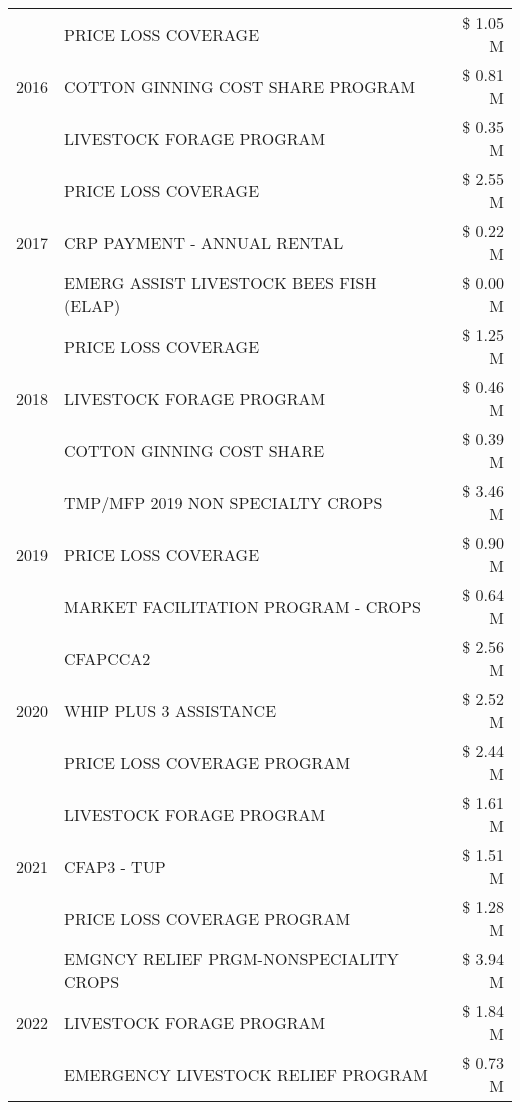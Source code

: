 \begin{tabular}{llr}
\cline{1-3}
\multirow[t]{3}{*}{2016} & PRICE LOSS COVERAGE & \$ 1.05 M \\
 & COTTON GINNING COST SHARE PROGRAM & \$ 0.81 M \\
 & LIVESTOCK FORAGE PROGRAM & \$ 0.35 M \\
\cline{1-3}
\multirow[t]{3}{*}{2017} & PRICE LOSS COVERAGE & \$ 2.55 M \\
 & CRP PAYMENT - ANNUAL RENTAL & \$ 0.22 M \\
 & EMERG ASSIST LIVESTOCK BEES FISH (ELAP) & \$ 0.00 M \\
\cline{1-3}
\multirow[t]{3}{*}{2018} & PRICE LOSS COVERAGE & \$ 1.25 M \\
 & LIVESTOCK FORAGE PROGRAM & \$ 0.46 M \\
 & COTTON GINNING COST SHARE & \$ 0.39 M \\
\cline{1-3}
\multirow[t]{3}{*}{2019} & TMP/MFP 2019 NON SPECIALTY CROPS & \$ 3.46 M \\
 & PRICE LOSS COVERAGE & \$ 0.90 M \\
 & MARKET FACILITATION PROGRAM - CROPS & \$ 0.64 M \\
\cline{1-3}
\multirow[t]{3}{*}{2020} & CFAPCCA2 & \$ 2.56 M \\
 & WHIP PLUS 3 ASSISTANCE & \$ 2.52 M \\
 & PRICE LOSS COVERAGE PROGRAM & \$ 2.44 M \\
\cline{1-3}
\multirow[t]{3}{*}{2021} & LIVESTOCK FORAGE PROGRAM & \$ 1.61 M \\
 & CFAP3 - TUP & \$ 1.51 M \\
 & PRICE LOSS COVERAGE PROGRAM & \$ 1.28 M \\
\cline{1-3}
\multirow[t]{3}{*}{2022} & EMGNCY RELIEF PRGM-NONSPECIALITY CROPS & \$ 3.94 M \\
 & LIVESTOCK FORAGE PROGRAM & \$ 1.84 M \\
 & EMERGENCY LIVESTOCK RELIEF PROGRAM & \$ 0.73 M \\
\cline{1-3}
\bottomrule
\end{tabular}
